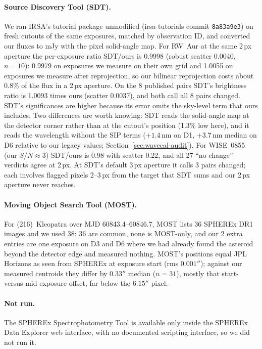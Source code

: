 \documentclass[11pt,a4paper]{article}
\begin{document}
\paragraph{Source Discovery Tool (SDT).} We ran IRSA's tutorial package unmodified (irsa-tutorials commit
\texttt{8a83a9e3}) on fresh cutouts of the same exposures, matched by observation ID, and converted our fluxes to mJy
with the pixel solid-angle map. For RW~Aur at the same 2\,px aperture the per-exposure ratio SDT/ours is 0.9998
(robust scatter 0.0040, $n=10$): 0.9979 on exposures we measure on their own grid and 1.0055 on exposures we measure
after reprojection, so our bilinear reprojection costs about 0.8\% of the flux in a 2\,px aperture. On the 8 published
pairs SDT's brightness ratio is 1.0093 times ours (scatter 0.0037), and both call all 8 pairs changed. SDT's
significances are higher because its error omits the sky-level term that ours includes. Two differences are worth
knowing: SDT reads the solid-angle map at the detector corner rather than at the cutout's position (1.3\% low here),
and it reads the wavelength without the SIP terms ($+1.4$\,nm on D1, $+3.7$\,nm median on D6 relative to our legacy
values; Section~\ref{sec:wavecal-audit}). For WISE~0855 (our $S/N\approx3$) SDT/ours is 0.98 with scatter 0.22, and all
27 ``no change'' verdicts agree at 2\,px. At SDT's default 3\,px aperture it calls 3 pairs changed; each involves
flagged pixels 2--3\,px from the target that SDT sums and our 2\,px aperture never reaches.

\paragraph{Moving Object Search Tool (MOST).} For (216)~Kleopatra over MJD 60843.4--60846.7, MOST lists 36 SPHEREx
DR1 images and we used 38: 36 are common, none is MOST-only, and our 2 extra entries are one exposure on D3 and D6
where we had already found the asteroid beyond the detector edge and measured nothing. MOST's positions equal JPL
Horizons as seen from SPHEREx at exposure start (rms $0.001''$); against our measured centroids they differ by
$0.33''$ median ($n=31$), mostly that start-versus-mid-exposure offset, far below the $6.15''$ pixel.

\paragraph{Not run.} The SPHEREx Spectrophotometry Tool is available only inside the SPHEREx Data Explorer web
interface, with no documented scripting interface, so we did not run it.
\end{document}
